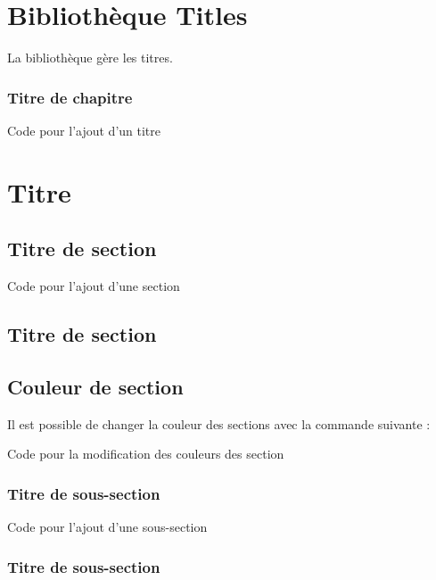 \chapter{Bibliothèque Titles}

La bibliothèque  gère les titres.\\

\subsection{Titre de chapitre}
\begin{Latex}{Code pour l'ajout d'un titre}
\chapter{Titre}
\end{Latex}

\section{Titre de section}
\begin{Latex}{Code pour l'ajout d'une section}
\section{Titre de section}
\end{Latex}

\section{Couleur de section}

Il est possible de changer la couleur des sections avec la commande suivante : \\

\begin{Latex}{Code pour la modification des couleurs des section}
\end{Latex}


\subsection{Titre de sous-section}

\begin{Latex}{Code pour l'ajout d'une sous-section}
\subsection{Titre de sous-section}
\end{Latex}

